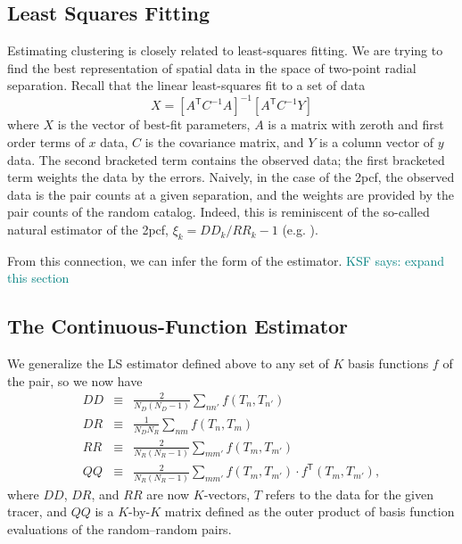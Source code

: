 \documentclass[modern]{aastex62}
\newcommand{\cf}{2pcf\xspace} %
\newcommand{\Est}{The Continuous-Function Estimator\xspace}
\newcommand{\LS}{LS\xspace}
\newcommand{\inv}{^{-1}}
\newcommand{\T}{^{\mathsf{T}}}
\newcommand{\KSF}[1]{\textcolor{teal}{KSF says: #1}}
\begin{document}
\subsection{Least Squares Fitting}

Estimating clustering is closely related to least-squares fitting.
We are trying to find the best representation of spatial data in the space of two-point radial separation.
Recall that the linear least-squares fit to a set of data 
\begin{equation}
X = [A\T C\inv A]\inv [A\T C\inv Y]
\end{equation}
where $X$ is the vector of best-fit parameters, $A$ is a matrix with zeroth and first order terms of $x$ data, $C$ is the covariance matrix, and $Y$ is a column vector of $y$ data.
The second bracketed term contains the observed data; the first bracketed term weights the data by the errors.
Naively, in the case of the \cf, the observed data is the pair counts at a given separation, and the weights are provided by the pair counts of the random catalog.
Indeed, this is reminiscent of the so-called natural estimator of the \cf, $\xi_k = DD_k/RR_k - 1$ (e.g. \citealt{Kerscher2000}).

From this connection, we can infer the form of the estimator.
\KSF{expand this section}

\subsection{\Est}
\label{sec:est}

We generalize the \LS estimator defined above to any set of $K$ basis functions $f$ of the pair, so we now have
\begin{eqnarray}\displaystyle
DD &\equiv& \frac{2}{N_D(N_D-1)} \sum_{n n'} f(T_n, T_{n'}) \\
DR &\equiv& \frac{1}{N_D N_R} \sum_{n m} f(T_n, T_{m}) \\
RR &\equiv& \frac{2}{N_R(N_R-1)} \sum_{m m'} f(T_m, T_{m'}) \\
QQ &\equiv& \frac{2}{N_R(N_R-1)} \sum_{m m'} f(T_m, T_{m'}) \cdot f\T(T_m, T_{m'}),
\end{eqnarray}
where $DD$, $DR$, and $RR$ are now $K$-vectors, $T$ refers to the data for the given tracer, and $QQ$ is a $K$-by-$K$ matrix defined as the outer product of basis function evaluations of the random--random pairs.
\end{document}
